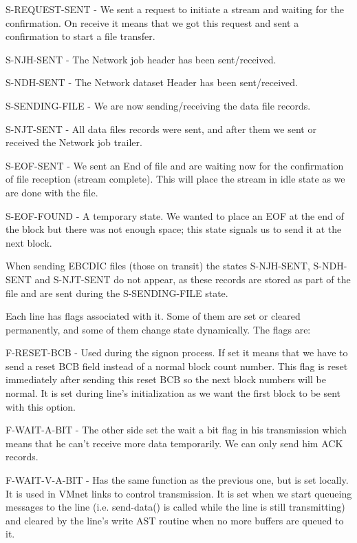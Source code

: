 S-REQUEST-SENT - We sent a request to initiate a stream and waiting  for
the  confirmation. On receive it means that we got this request and sent
a confirmation to start a file transfer.

S-NJH-SENT - The Network job header has been sent/received.

S-NDH-SENT - The Network dataset Header has been sent/received.

S-SENDING-FILE - We are now sending/receiving the data file records.

S-NJT-SENT - All data files records were sent, and after them we sent or
received the Network job trailer.

S-EOF-SENT  -  We  sent  an  End  of  file  and  are waiting now for the
confirmation of file reception (stream complete). This  will  place  the
stream in idle state as we are done with the file.

S-EOF-FOUND - A temporary state. We wanted to place an EOF at the end of
the block but there was not enough space; this state signals us to  send
it at the next block.

When  sending  EBCDIC files (those on transit) the states S-NJH-SENT,
S-NDH-SENT and S-NJT-SENT do not appear, as these records are stored  as
part of the file and are sent during the S-SENDING-FILE state.


Each  line  has  flags  associated  with  it. Some of them are set or
cleared permanently, and some of  them  change  state  dynamically.  The
flags are:

F-RESET-BCB  -  Used  during the signon process. If set it means that we
have to send a reset BCB field instead of a normal block  count  number.
This  flag is reset immediately after sending this reset BCB so the next
block numbers will be normal. It is set during line's initialization  as
we want the first block to be sent with this option.

F-WAIT-A-BIT  -  The  other  side  set  the  wait  a  bit  flag  in  his
transmission which means that he can't receive more data temporarily. We
can only send him ACK records.

F-WAIT-V-A-BIT  -  Has the same function as the previous one, but is set
locally. It is used in VMnet links to control transmission.  It  is  set
when  we start queueing messages to the line (i.e. send-data() is called
while the line is still transmitting) and cleared by  the  line's  write
AST routine when no more buffers are queued to it.

